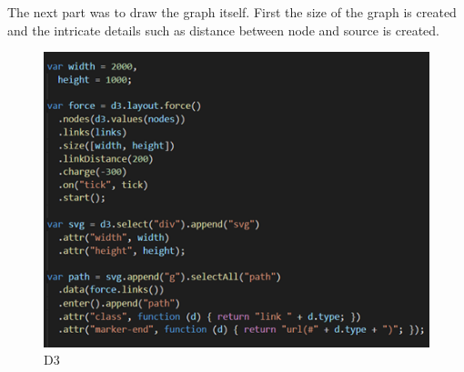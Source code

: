 The next part was to draw the graph itself. First the size of the graph is created and the intricate details such as distance between node and source is created. \\
\begin{figure}[H]
    \centering
    \includegraphics{img/Graph4.png}
    \caption{D3} 
    \label{fig:my_label}
\end{figure}

